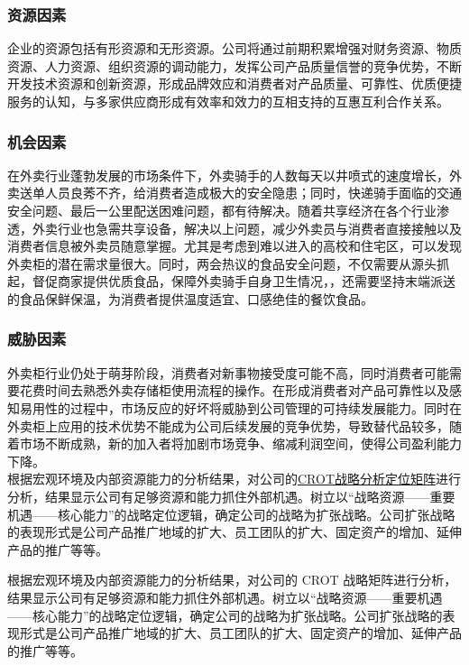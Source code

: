 \documentclass[violet]{main}
\begin{document}
			\subsubsection{资源因素}
				企业的资源包括有形资源和无形资源。公司将通过前期积累增强对财务资源、物质资源、人力资源、组织资源的调动能力，发挥公司产品质量信誉的竞争优势，不断开发技术资源和创新资源，形成品牌效应和消费者对产品质量、可靠性、优质便捷服务的认知，与多家供应商形成有效率和效力的互相支持的互惠互利合作关系。
			\subsubsection{机会因素}
				在外卖行业蓬勃发展的市场条件下，外卖骑手的人数每天以井喷式的速度增长，外卖送单人员良莠不齐，给消费者造成极大的安全隐患；同时，快递骑手面临的交通安全问题、最后一公里配送困难问题，都有待解决。随着共享经济在各个行业渗透，外卖行业也急需共享设备，解决以上问题，减少外卖员与消费者直接接触以及消费者信息被外卖员随意掌握。尤其是考虑到难以进入的高校和住宅区，可以发现外卖柜的潜在需求量很大。同时，两会热议的食品安全问题，不仅需要从源头抓起，督促商家提供优质食品，保障外卖骑手自身卫生情况，，还需要坚持末端派送的食品保鲜保温，为消费者提供温度适宜、口感绝佳的餐饮食品。
			\subsubsection{威胁因素}
				外卖柜行业仍处于萌芽阶段，消费者对新事物接受度可能不高，同时消费者可能需要花费时间去熟悉外卖存储柜使用流程的操作。在形成消费者对产品可靠性以及感知易用性的过程中，市场反应的好坏将威胁到公司管理的可持续发展能力。同时在外卖柜上应用的技术优势不能成为公司后续发展的竞争优势，导致替代品较多，随着市场不断成熟，新的加入者将加剧市场竞争、缩减利润空间，使得公司盈利能力下降。
				\\\indent 根据宏观环境及内部资源能力的分析结果，对公司的\hyperlink{CROT战略分析定位矩阵}{CROT战略分析定位矩阵}进行分析，结果显示公司有足够资源和能力抓住外部机遇。树立以“战略资源——重要机遇——核心能力”的战略定位逻辑，确定公司的战略为扩张战略。公司扩张战略的表现形式是公司产品推广地域的扩大、员工团队的扩大、固定资产的增加、延伸产品的推广等等。
				\begin{center}
					\Tcbset{}
				\end{center}
			根据宏观环境及内部资源能力的分析结果，对公司的 CROT 战略矩阵进行分析，结果显示公司有足够资源和能力抓住外部机遇。树立以“战略资源——重要机遇——核心能力”的战略定位逻辑，确定公司的战略为扩张战略。公司扩张战略的表现形式是公司产品推广地域的扩大、员工团队的扩大、固定资产的增加、延伸产品的推广等等。
\end{document}
